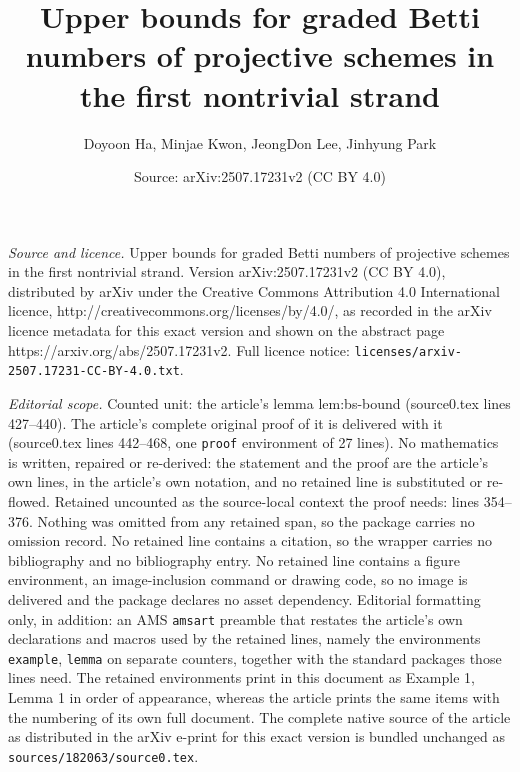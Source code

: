 \documentclass[10pt,a4paper]{amsart}
\title{Upper bounds for graded Betti numbers of projective schemes in the first nontrivial strand}
\author{Doyoon Ha, Minjae Kwon, JeongDon Lee, Jinhyung Park}
\date{Source: arXiv:2507.17231v2 (CC BY 4.0)}
\begin{document}
\maketitle

\noindent\emph{Source and licence.} Upper bounds for graded Betti numbers of projective schemes in the first nontrivial strand. Version arXiv:2507.17231v2 (CC BY 4.0), distributed by arXiv under the Creative Commons Attribution 4.0 International licence, http://creativecommons.org/licenses/by/4.0/, as recorded in the arXiv licence metadata for this exact version and shown on the abstract page https://arxiv.org/abs/2507.17231v2. Full licence notice: \texttt{licenses/arxiv-2507.17231-CC-BY-4.0.txt}.\par\smallskip

\noindent\textit{Editorial scope.} Counted unit: the article's lemma lem:bs-bound (source0.tex lines 427--440). The article's complete original proof of it is delivered with it (source0.tex lines 442--468, one \texttt{proof} environment of 27 lines). No mathematics is written, repaired or re-derived: the statement and the proof are the article's own lines, in the article's own notation, and no retained line is substituted or re-flowed.  Retained uncounted as the source-local context the proof needs: lines 354--376.  Nothing was omitted from any retained span, so the package carries no omission record.  No retained line contains a citation, so the wrapper carries no bibliography and no bibliography entry.  No retained line contains a figure environment, an image-inclusion command or drawing code, so no image is delivered and the package declares no asset dependency.  Editorial formatting only, in addition: an AMS \texttt{amsart} preamble that restates the article's own declarations and macros used by the retained lines, namely the environments \texttt{example}, \texttt{lemma} on separate counters, together with the standard packages those lines need.  The retained environments print in this document as Example 1, Lemma 1 in order of appearance, whereas the article prints the same items with the numbering of its own full document.  The complete native source of the article as distributed in the arXiv e-print for this exact version is bundled unchanged as \texttt{sources/182063/source0.tex}.
\end{document}
